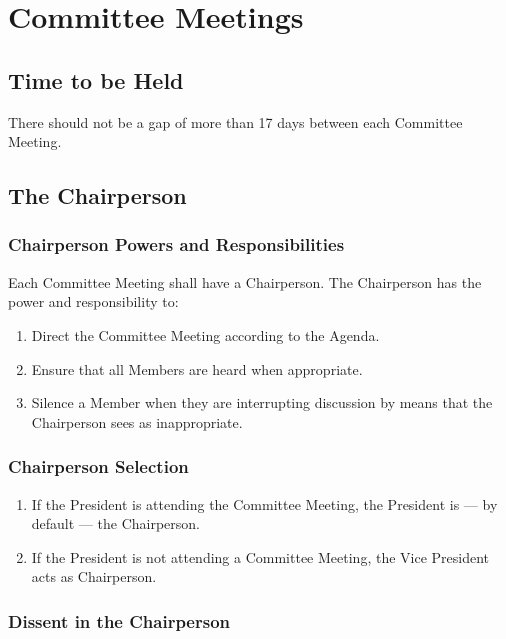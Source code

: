 \documentclass[a4paper,12pt]{article}
\begin{document}
\section{Committee Meetings}

\subsection{Time to be Held}

There should not be a gap of more than 17 days between each Committee Meeting.

\subsection{The Chairperson}

\subsubsection{Chairperson Powers and Responsibilities}

Each Committee Meeting shall have a Chairperson. The Chairperson has the power and responsibility to:

\begin{enumerate}
	\item Direct the Committee Meeting according to the Agenda.
	\item Ensure that all Members are heard when appropriate.
	\item Silence a Member when they are interrupting discussion by means that the Chairperson sees as inappropriate.
\end{enumerate}

\subsubsection{Chairperson Selection}

\begin{enumerate}
	\item If the President is attending the Committee Meeting, the President is --- by default --- the Chairperson.
	\item If the President is not attending a Committee Meeting, the Vice President acts as Chairperson.
\end{enumerate}

\subsubsection{Dissent in the Chairperson}
\end{document}
